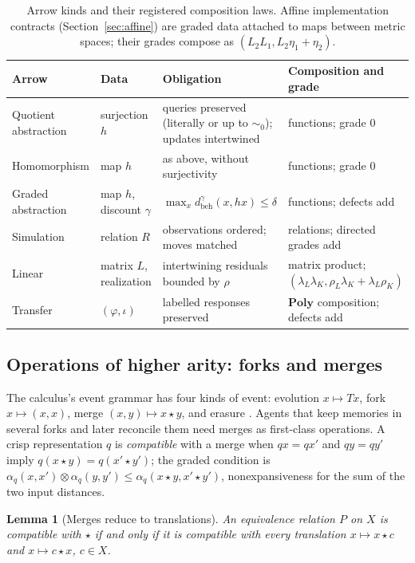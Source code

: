 \documentclass[11pt]{article}
\newcommand{\Lt}{\otimes}
\newcommand{\Poly}{\mathbf{Poly}}
\newcommand{\dbeh}{d_{\mathrm{beh}}}
\theoremstyle{definition}
\theoremstyle{plain}
\newtheorem{lemma}[definition]{Lemma}
\begin{document}
\begin{table}[ht]
\centering\small
\begin{tabularx}{\textwidth}{>{\raggedright\arraybackslash}p{2.6cm}>{\raggedright\arraybackslash}p{2.8cm}>{\raggedright\arraybackslash}X>{\raggedright\arraybackslash}p{3.6cm}}
\toprule
Arrow & Data & Obligation & Composition and grade\\
\midrule
Quotient abstraction & surjection $h$ & queries preserved (literally or up to $\sim_0$); updates intertwined & functions; grade $0$\\
Homomorphism & map $h$ & as above, without surjectivity & functions; grade $0$\\
Graded abstraction & map $h$, discount $\gamma$ & $\max_x\dbeh^\gamma(x,hx)\le\delta$ & functions; defects add\\
Simulation & relation $R$ & observations ordered; moves matched & relations; directed grades add\\
Linear & matrix $L$, realization & intertwining residuals bounded by $\rho$ & matrix product; $(\lambda_L\lambda_K,\rho_L\lambda_K+\lambda_L\rho_K)$\\
Transfer & $(\varphi,\iota)$ & labelled responses preserved & $\Poly$ composition; defects add\\
\bottomrule
\end{tabularx}
\caption{Arrow kinds and their registered composition laws. Affine implementation contracts
(Section~\ref{sec:affine}) are graded data attached to maps between metric spaces; their grades
compose as $(L_2L_1,L_2\eta_1+\eta_2)$.}\label{tab:arrows}
\end{table}

\subsection{Operations of higher arity: forks and merges}\label{sec:merges}

The calculus's event grammar has four kinds of event: evolution $x\mapsto Tx$, fork
$x\mapsto(x,x)$, merge $(x,y)\mapsto x\star y$, and erasure \cite{dclosure}. Agents that keep
memories in several forks and later reconcile them need merges as first-class operations. A
crisp representation $q$ is \emph{compatible} with a merge when $qx=qx'$ and $qy=qy'$ imply
$q(x\star y)=q(x'\star y')$; the graded condition is
$\alpha_q(x,x')\Lt\alpha_q(y,y')\le\alpha_q(x\star y,x'\star y')$, nonexpansiveness for the sum
of the two input distances.

\begin{lemma}[Merges reduce to translations]\label{lem:translations}
An equivalence relation $P$ on $X$ is compatible with $\star$ if and only if it is compatible
with every translation $x\mapsto x\star c$ and $x\mapsto c\star x$, $c\in X$.
\end{lemma}
\end{document}
